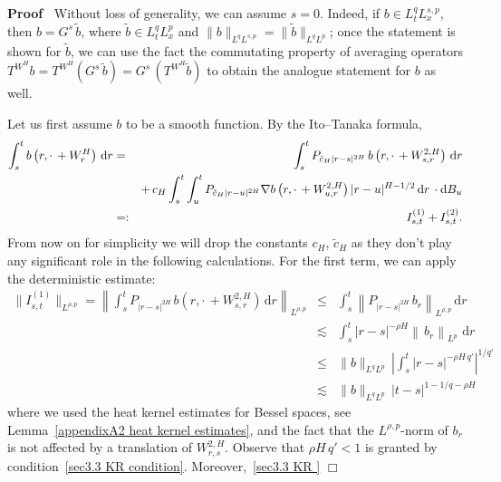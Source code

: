\documentclass[10pt]{article}
\newcommand{\mathd}{\mathrm{d}}
\newcommand{\tmcolor}[2]{{\color{#1}{#2}}}
\newenvironment{proof}{\noindent\textbf{Proof\ }}{\hspace*{\fill}$\Box$\medskip}
\begin{document}
\begin{proof}
  Without loss of generality, we can assume $s = 0$. Indeed, if $b \in L^q_t
  L^{s, p}_x$, then $b = G^s \, \tilde{b}$, where $\tilde{b} \in L^q_t L^p_x$
  and $\| b \|_{L^q L^{s, p}} = \| \tilde{b} \|_{L^q L^p}$; once the statement
  is shown for $\tilde{b}$, we can use the fact the commutating property of
  averaging operators $T^{W^H} b = T^{W^H} \left( G^s \, \tilde{b} \right) =
  G^s \, (T^{W^H} \tilde{b})$ to obtain the analogue statement for $b$ as
  well.
  
  Let us first assume $b$ to be a smooth function. By the Ito--Tanaka formula,
  \begin{eqnarray*}
    \int_s^t b \left( r, \cdot \, + W^H_r \right) \, \mathd r & = &
    \tmcolor{black}{\int_s^t P_{\tilde{c}_H | r - s |^{2 H}} \, b \left( r,
    \cdot \, + W^{2, H}_{s, r} \right) \, \mathd r}\\
    &  & + \, c_H \int_s^t \int_u^t P_{\tilde{c}_H | r - u |^{2 H}} \nabla b
    \left( r, \cdot \, + W^{2, H}_{u, r} \right) | r - u |^{H - 1 / 2} \,
    \mathd r \, \cdot \mathd B_u\\
    & = : & I^{(1)}_{s, t} + I_{s, t}^{(2)} .
  \end{eqnarray*}
  From now on for simplicity we will drop the constants $c_H$, $\tilde{c}_H$
  as they don't play any significant role in the following calculations. For
  the first term, we can apply the deterministic estimate:
  \begin{eqnarray*}
    \| I_{s, t}^{(1)} \|_{L^{\rho, p}} = \left\| \int_s^t P_{| r - s |^{2 H}}
    \, b \left( r, \cdot \, + W^{2, H}_{s, r} \right) \, \mathd r
    \right\|_{L^{\rho, p}} & \leqslant & \int_s^t \left\| P_{| r - s |^{2 H}}
    \, b_r \right\|_{L^{\rho, p}} \, \mathd r\\
    & \lesssim & \int_s^t | r - s |^{- \rho H} \left\| \, b_r
    \right\|_{L^p} \, \, \mathd r\\
    & \leqslant & \| b \|_{L^q L^p} \, \left| \int_s^t | r - s |^{- \rho H \,
    q'} \right|^{1 / q'}\\
    & \lesssim & \| b \|_{L^q L^p} \, | t - s |^{1 - 1 / q - \rho H}
  \end{eqnarray*}
  where we used the heat kernel estimates for Bessel spaces, see
  Lemma~\ref{appendixA2 heat kernel estimates}, and the fact that the
  $L^{\rho, p}$\mbox{-}norm of $b_r$ is not affected by a translation of
  $W^{2, H}_{r, s}$. Observe that $\rho H \, q' < 1$ is granted by
  condition~{\eqref{sec3.3 KR condition}}. Moreover,~{\eqref{sec3.3 KR
}}
\end{proof}
\end{document}
